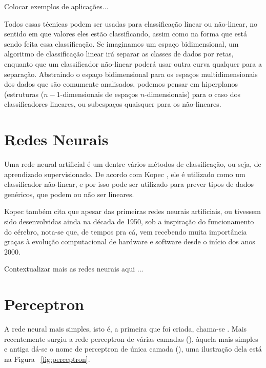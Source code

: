 Colocar exemplos de aplicações...

Todos essas técnicas podem ser usadas para classificação linear ou não-linear, no sentido em que valores eles estão classificando, assim como na forma que está sendo feita essa classificação. Se imaginamos um espaço bidimensional, um algoritmo de classificação linear irá separar as classes de dados por retas, enquanto que um classificador não-linear poderá usar outra curva qualquer para a separação. Abstraindo o espaço bidimensional para os espaços multidimensionais dos dados que são comumente analisados, podemos pensar em hiperplanos (estruturas ($n{-}1$-dimensionais de espaços $n$-dimensionais) para o caso dos classificadores lineares, ou subespaços quaisquer para os não-lineares.

\section{Redes Neurais}

Uma rede neural artificial é um dentre vários métodos de classificação, ou seja, de aprendizado supervisionado. De acordo com Kopec \citep{classic}, ele é utilizado como um classificador não-linear, e por isso pode ser utilizado para prever tipos de dados genéricos, que podem ou não ser lineares. 

Kopec \citep{classic} também cita que apesar das primeiras redes neurais artificiais, ou  tivessem sido desenvolvidas ainda na década de 1950, sob a inspiração do funcionamento do cérebro, nota-se que, de tempos pra cá, vem recebendo muita importância graças à evolução computacional de hardware e software desde o início dos anos 2000.

Contextualizar mais as redes neurais aqui ...

\section{Perceptron}

A rede neural mais simples, isto é, a primeira que foi criada, chama-se . Mais recentemente surgiu a rede perceptron de várias camadas (), àquela mais simples e antiga dá-se o nome de perceptron de única camada (), uma ilustração dela está na Figura ~\ref{fig:perceptron}. 

